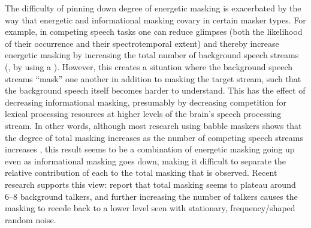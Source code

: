
The difficulty of pinning down degree of energetic masking is exacerbated by the way that energetic and informational masking covary in certain masker types.  For example, in competing speech tasks one can reduce glimpses (both the likelihood of their occurrence and their spectrotemporal extent) and thereby increase energetic masking by increasing the total number of background speech streams (\ie, by using a ).  However, this creates a situation where the background speech streams “mask” one another in addition to masking the target stream, such that the background speech itself becomes harder to understand.  This has the effect of decreasing informational masking, presumably by decreasing competition for lexical processing resources at higher levels of the brain’s speech processing stream.  In other words, although most research using babble maskers shows that the degree of total masking increases as the number of competing speech streams increases \citep[\eg,][]{Miller1947, BrungartEtAl2001}, this result seems to be a combination of energetic masking going up even as informational masking goes down, making it difficult to separate the relative contribution of each to the total masking that is observed.  Recent research supports this view: \citet{SimpsonCooke2005} report that total masking seems to plateau around 6–8 background talkers, and further increasing the number of talkers causes the masking to recede back to a lower level seen with stationary, frequency\-/shaped random noise.  %
